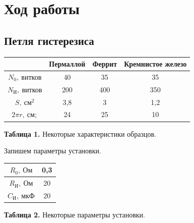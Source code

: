 \documentclass[a4paper, 12pt]{article}%
\begin{document}
\section*{Ход работы}

\subsection*{Петля гистерезиса}

\begin{center}
\begin{tabular}{|c|c|c|c|}
\hline 
 & Пермаллой & Феррит & Кремнистое железо \\ 
\hline 
$N_0, \: \textit{витков}$ & 40 & 35 & 35 \\ 
\hline 
$N_{\textit{И}}, \: \textit{витков}$ & 200 & 400 & 350 \\ 
\hline 
$S, \: \textit{см}^2$ & 3,8 & 3 & 1,2 \\ 
\hline 
$2\pi r, \: \textit{см};$ & 24 & 25 & 10 \\ 
\hline 
\end{tabular}

\textbf{Таблица 1.} Некоторые характеристики образцов.
\end{center}

Запишем параметры установки.

\begin{center}
\begin{tabular}{|c|c|}
\hline 
$R_0, \: \textit{Ом}$ & 0,3 \\ 
\hline 
$R_{\textit{И}}, \: \textit{Ом}$ & 20 \\ 
\hline 
$C_{\textit{И}}, \: \textit{мкФ}$ & 20 \\ 
\hline 
\end{tabular} 

\textbf{Таблица 2.} Некоторые параметры установки.
\end{center}
\end{document}

